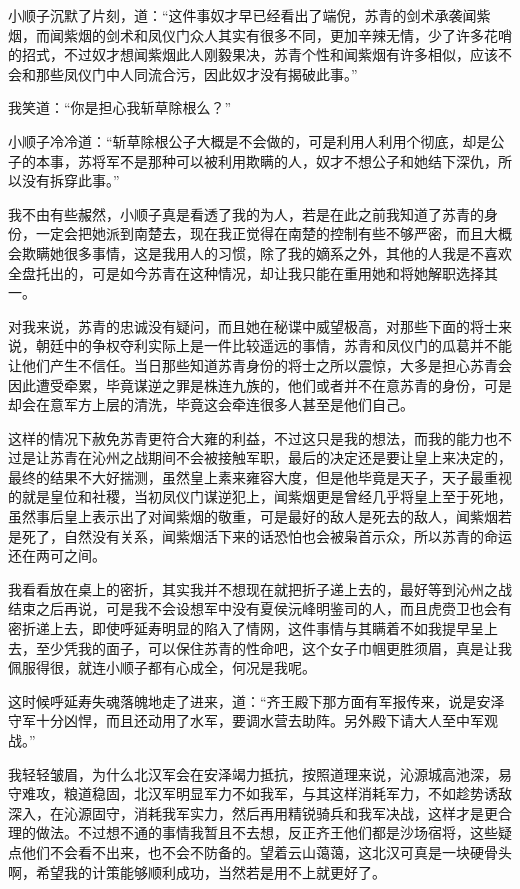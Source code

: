 小顺子沉默了片刻，道：“这件事奴才早已经看出了端倪，苏青的剑术承袭闻紫烟，而闻紫烟的剑术和凤仪门众人其实有很多不同，更加辛辣无情，少了许多花哨的招式，不过奴才想闻紫烟此人刚毅果决，苏青个性和闻紫烟有许多相似，应该不会和那些凤仪门中人同流合污，因此奴才没有揭破此事。”

我笑道：“你是担心我斩草除根么？”

小顺子冷冷道：“斩草除根公子大概是不会做的，可是利用人利用个彻底，却是公子的本事，苏将军不是那种可以被利用欺瞒的人，奴才不想公子和她结下深仇，所以没有拆穿此事。”

我不由有些赧然，小顺子真是看透了我的为人，若是在此之前我知道了苏青的身份，一定会把她派到南楚去，现在我正觉得在南楚的控制有些不够严密，而且大概会欺瞒她很多事情，这是我用人的习惯，除了我的嫡系之外，其他的人我是不喜欢全盘托出的，可是如今苏青在这种情况，却让我只能在重用她和将她解职选择其一。

对我来说，苏青的忠诚没有疑问，而且她在秘谍中威望极高，对那些下面的将士来说，朝廷中的争权夺利实际上是一件比较遥远的事情，苏青和凤仪门的瓜葛并不能让他们产生不信任。当日那些知道苏青身份的将士之所以震惊，大多是担心苏青会因此遭受牵累，毕竟谋逆之罪是株连九族的，他们或者并不在意苏青的身份，可是却会在意军方上层的清洗，毕竟这会牵连很多人甚至是他们自己。

这样的情况下赦免苏青更符合大雍的利益，不过这只是我的想法，而我的能力也不过是让苏青在沁州之战期间不会被接触军职，最后的决定还是要让皇上来决定的，最终的结果不大好揣测，虽然皇上素来雍容大度，但是他毕竟是天子，天子最重视的就是皇位和社稷，当初凤仪门谋逆犯上，闻紫烟更是曾经几乎将皇上至于死地，虽然事后皇上表示出了对闻紫烟的敬重，可是最好的敌人是死去的敌人，闻紫烟若是死了，自然没有关系，闻紫烟活下来的话恐怕也会被枭首示众，所以苏青的命运还在两可之间。

我看看放在桌上的密折，其实我并不想现在就把折子递上去的，最好等到沁州之战结束之后再说，可是我不会设想军中没有夏侯沅峰明鉴司的人，而且虎赍卫也会有密折递上去，即使呼延寿明显的陷入了情网，这件事情与其瞒着不如我提早呈上去，至少凭我的面子，可以保住苏青的性命吧，这个女子巾帼更胜须眉，真是让我佩服得很，就连小顺子都有心成全，何况是我呢。

这时候呼延寿失魂落魄地走了进来，道：“齐王殿下那方面有军报传来，说是安泽守军十分凶悍，而且还动用了水军，要调水营去助阵。另外殿下请大人至中军观战。”

我轻轻皱眉，为什么北汉军会在安泽竭力抵抗，按照道理来说，沁源城高池深，易守难攻，粮道稳固，北汉军明显军力不如我军，与其这样消耗军力，不如趁势诱敌深入，在沁源固守，消耗我军实力，然后再用精锐骑兵和我军决战，这样才是更合理的做法。不过想不通的事情我暂且不去想，反正齐王他们都是沙场宿将，这些疑点他们不会看不出来，也不会不防备的。望着云山蔼蔼，这北汉可真是一块硬骨头啊，希望我的计策能够顺利成功，当然若是用不上就更好了。

